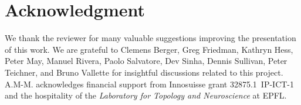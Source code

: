 \section*{Acknowledgment}

We thank the reviewer for many valuable suggestions improving the presentation of this work.
We are grateful to Clemens Berger, Greg Friedman, Kathryn Hess, Peter May, Manuel Rivera, Paolo Salvatore, Dev Sinha, Dennis Sullivan, Peter Teichner, and Bruno Vallette for insightful discussions related to this project.
\mbox{A.M-M.} acknowledges financial support from Innosuisse grant 32875.1~IP-ICT-1 and the hospitality of the \textit{Laboratory for Topology and Neuroscience} at EPFL.